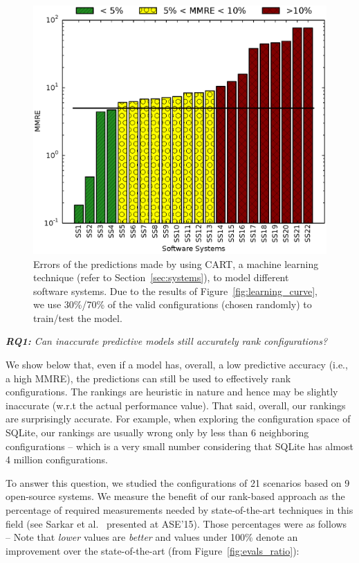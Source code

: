 \documentclass[sigconf]{acmart}
\newcommand{\fig}[1]{Figure~\ref{fig:#1}}
\begin{document}
\begin{figure}[t]
\centering
\includegraphics[scale=0.35]{Figures/figure1}
\caption{{\small Errors of the predictions made by using CART, a machine learning technique (refer to Section~\ref{sec:systems}), to model different
software systems. Due to the results of \fig{learning_curve}, we use  30\%/70\% of the  valid configurations (chosen randomly) to train/test the model. }
}
\label{fig:model_efficiency}
\end{figure}


  \noindent
  {\em  {\bf RQ1:}  Can  inaccurate predictive  models still accurately rank
configurations?}

We show below that,   even if a model has, overall, a low predictive accuracy (i.e., a high MMRE), the
predictions can still be used to effectively rank configurations.
The rankings are heuristic in nature and hence may be slightly inaccurate (w.r.t the actual performance value).
That said, overall, our rankings are surprisingly accurate. For example,
when exploring the configuration space of SQLite, our 
rankings are usually wrong only by less than 6 neighboring configurations -- which is a very small number
considering that SQLite has almost 4 million configurations.


To answer this question, we studied the configurations of 21 scenarios based on 9 open-source systems.
We measure the benefit of our rank-based approach
as  the percentage of required measurements
needed by state-of-the-art techniques in this field (see Sarkar et al.~\cite{sarkar2015cost} presented at ASE'15). Those percentages were as follows -- 
Note that {\em lower} values are {\em better} and values under 100\% denote
an improvement over  the state-of-the-art (from Figure~\ref{fig:evals_ratio}):  
\end{document}
